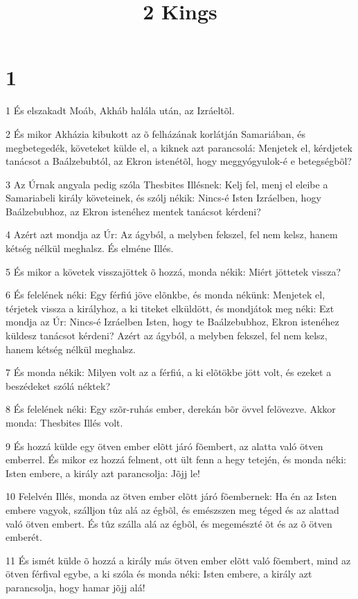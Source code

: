 

\title{2 Kings}


\chapter{1}

\par 1 És elszakadt Moáb, Akháb halála után, az Izráeltõl.
\par 2 És mikor Akházia kibukott az õ felházának korlátján Samariában, és megbetegedék, követeket külde el, a kiknek azt parancsolá: Menjetek el, kérdjetek tanácsot a Baálzebubtól, az Ekron istenétõl, hogy meggyógyulok-é e betegségbõl?
\par 3 Az Úrnak angyala pedig szóla Thesbites Illésnek: Kelj fel, menj el eleibe a Samariabeli király követeinek, és szólj nékik: Nincs-é Isten Izráelben, hogy Baálzebubhoz, az Ekron istenéhez mentek tanácsot kérdeni?
\par 4 Azért azt mondja az Úr: Az ágyból, a melyben fekszel, fel nem kelsz, hanem kétség nélkül meghalsz. És elméne Illés.
\par 5 És mikor a követek visszajöttek õ hozzá, monda nékik: Miért jöttetek vissza?
\par 6 És felelének néki: Egy férfiú jöve elõnkbe, és monda nékünk: Menjetek el, térjetek vissza a királyhoz, a ki titeket elküldött, és mondjátok meg néki: Ezt mondja az Úr: Nincs-é Izráelben Isten, hogy te Baálzebubhoz, Ekron istenéhez küldesz tanácsot kérdeni? Azért az ágyból, a melyben fekszel, fel nem kelsz, hanem kétség nélkül meghalsz.
\par 7 És monda nékik: Milyen volt az a férfiú, a ki elõtökbe jött volt, és ezeket a beszédeket szólá néktek?
\par 8 És felelének néki: Egy szõr-ruhás ember, derekán bõr övvel felövezve. Akkor monda: Thesbites Illés volt.
\par 9 És hozzá külde egy ötven ember elõtt járó fõembert, az alatta való ötven emberrel. És mikor ez hozzá felment, ott ült fenn a hegy tetején, és monda néki: Isten embere, a király azt parancsolja: Jõjj le!
\par 10 Felelvén Illés, monda az ötven ember elõtt járó fõembernek: Ha én az Isten embere vagyok, szálljon tûz alá az égbõl, és emészszen meg téged és az alattad való ötven embert. És tûz szálla alá az égbõl, és megemészté õt és az õ ötven emberét.
\par 11 És ismét külde õ hozzá a király más ötven ember elõtt való fõembert, mind az ötven férfival egybe, a ki szóla és monda néki: Isten embere, a király azt parancsolja, hogy hamar jõjj alá!

